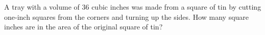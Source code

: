 A tray with a volume of $36$ cubic inches was made from a square of tin by cutting one-inch squares from the corners and turning up the sides. How many square inches are in the area of the original square of tin?
